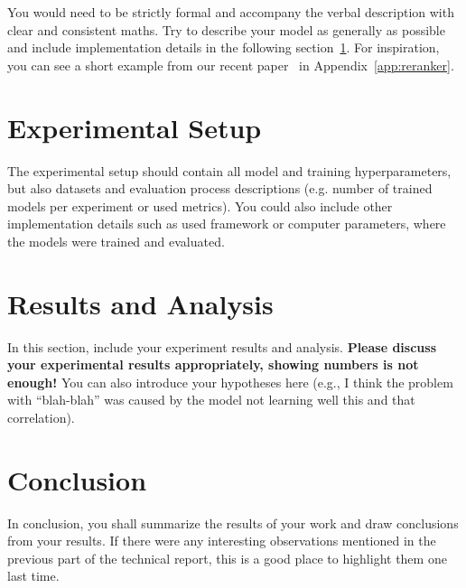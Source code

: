 \documentclass[11pt]{article}
\begin{document}
You would need to be strictly formal and accompany the verbal description with clear and consistent maths. 
Try to describe your model as generally as possible and include implementation details in the following section~\ref{sec:setup}. 
For inspiration, you can see a short example from our recent paper~\cite{fajcik2021r2d2} in Appendix~\ref{app:reranker}.

\section{Experimental Setup}
\label{sec:setup}
The experimental setup should contain all model and training hyperparameters, but also datasets and evaluation process descriptions (e.g. number of trained models per experiment or used metrics). 
You could also include other implementation details such as used framework or computer parameters, where the models were trained and evaluated.

\section{Results and Analysis}
In this section, include your experiment results and analysis. \textbf{Please discuss your experimental results appropriately, showing numbers is not enough!} You can also introduce your hypotheses here (e.g., I think the problem with ``blah-blah'' was caused by the model not learning well this and that correlation).

\section{Conclusion}
In conclusion, you shall summarize the results of your work and draw conclusions from your results. If there were any interesting observations mentioned in the previous part of the technical report, this is a good place to highlight them one last time.


\nocite{*}



\appendix
\end{document}
